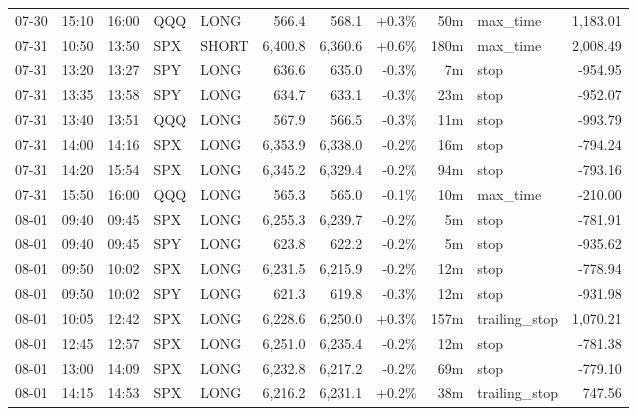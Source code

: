 \documentclass[11pt,a4paper,twoside]{article}
\begin{document}
\begin{center}
\begin{longtable}{>{\color{txtmain}}l l l l l r r r r >{\color{txtmain}}l r}
07-30 & 15:10 & 16:00 & QQQ & LONG & 566.4 & 568.1 & \textcolor{wingreen}{+0.3\%} & 50m & max\_time & \textcolor{wingreen}{1,183.01} \\
07-31 & 10:50 & 13:50 & SPX & SHORT & 6,400.8 & 6,360.6 & \textcolor{wingreen}{+0.6\%} & 180m & max\_time & \textcolor{wingreen}{2,008.49} \\
07-31 & 13:20 & 13:27 & SPY & LONG & 636.6 & 635.0 & \textcolor{lossred}{-0.3\%} & 7m & stop & \textcolor{lossred}{-954.95} \\
07-31 & 13:35 & 13:58 & SPY & LONG & 634.7 & 633.1 & \textcolor{lossred}{-0.3\%} & 23m & stop & \textcolor{lossred}{-952.07} \\
07-31 & 13:40 & 13:51 & QQQ & LONG & 567.9 & 566.5 & \textcolor{lossred}{-0.3\%} & 11m & stop & \textcolor{lossred}{-993.79} \\
07-31 & 14:00 & 14:16 & SPX & LONG & 6,353.9 & 6,338.0 & \textcolor{lossred}{-0.2\%} & 16m & stop & \textcolor{lossred}{-794.24} \\
07-31 & 14:20 & 15:54 & SPX & LONG & 6,345.2 & 6,329.4 & \textcolor{lossred}{-0.2\%} & 94m & stop & \textcolor{lossred}{-793.16} \\
07-31 & 15:50 & 16:00 & QQQ & LONG & 565.3 & 565.0 & \textcolor{lossred}{-0.1\%} & 10m & max\_time & \textcolor{lossred}{-210.00} \\
08-01 & 09:40 & 09:45 & SPX & LONG & 6,255.3 & 6,239.7 & \textcolor{lossred}{-0.2\%} & 5m & stop & \textcolor{lossred}{-781.91} \\
08-01 & 09:40 & 09:45 & SPY & LONG & 623.8 & 622.2 & \textcolor{lossred}{-0.2\%} & 5m & stop & \textcolor{lossred}{-935.62} \\
08-01 & 09:50 & 10:02 & SPX & LONG & 6,231.5 & 6,215.9 & \textcolor{lossred}{-0.2\%} & 12m & stop & \textcolor{lossred}{-778.94} \\
08-01 & 09:50 & 10:02 & SPY & LONG & 621.3 & 619.8 & \textcolor{lossred}{-0.3\%} & 12m & stop & \textcolor{lossred}{-931.98} \\
08-01 & 10:05 & 12:42 & SPX & LONG & 6,228.6 & 6,250.0 & \textcolor{wingreen}{+0.3\%} & 157m & trailing\_stop & \textcolor{wingreen}{1,070.21} \\
08-01 & 12:45 & 12:57 & SPX & LONG & 6,251.0 & 6,235.4 & \textcolor{lossred}{-0.2\%} & 12m & stop & \textcolor{lossred}{-781.38} \\
08-01 & 13:00 & 14:09 & SPX & LONG & 6,232.8 & 6,217.2 & \textcolor{lossred}{-0.2\%} & 69m & stop & \textcolor{lossred}{-779.10} \\
08-01 & 14:15 & 14:53 & SPX & LONG & 6,216.2 & 6,231.1 & \textcolor{wingreen}{+0.2\%} & 38m & trailing\_stop & \textcolor{wingreen}{747.56} \\

\end{longtable}
\end{center}
\end{document}
